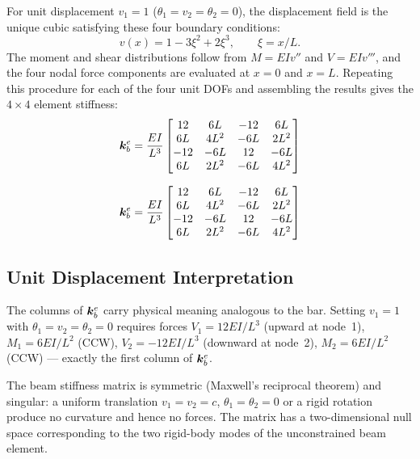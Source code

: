 For unit displacement $v_1 = 1$ ($\theta_1 = v_2 = \theta_2 = 0$), the
displacement field is the unique cubic satisfying these four boundary
conditions:
\[
    v(x) = 1 - 3\xi^2 + 2\xi^3, \qquad \xi = x/L .
\]
The moment and shear distributions follow from $M = EI v''$ and
$V = EI v'''$, and the four nodal force components are evaluated at
$x=0$ and $x=L$. Repeating this procedure for each of the four unit
DOFs and assembling the results gives the $4\times4$ element stiffness:
\begin{equation}
    \bm{k}^e_b = \frac{EI}{L^3}
    \begin{bmatrix}
        12  &  6L  & -12  &  6L \\
        6L  & 4L^2 & -6L  & 2L^2 \\
       -12  & -6L  &  12  & -6L \\
        6L  & 2L^2 & -6L  & 4L^2
    \end{bmatrix}
    \label{eq:beam_stiffness}
\end{equation}

\begin{importantbox}
\begin{equation*}
    \bm{k}^e_b = \frac{EI}{L^3}
    \begin{bmatrix}
        12  &  6L  & -12  &  6L \\
        6L  & 4L^2 & -6L  & 2L^2 \\
       -12  & -6L  &  12  & -6L \\
        6L  & 2L^2 & -6L  & 4L^2
    \end{bmatrix}
\end{equation*}
\end{importantbox}

\subsection{Unit Displacement Interpretation}

The columns of $\bm{k}^e_b$ carry physical meaning analogous to the bar.
Setting $v_1 = 1$ with $\theta_1 = v_2 = \theta_2 = 0$ requires forces
$V_1 = 12EI/L^3$ (upward at node~1), $M_1 = 6EI/L^2$ (CCW),
$V_2 = -12EI/L^3$ (downward at node~2), $M_2 = 6EI/L^2$ (CCW) —
exactly the first column of $\bm{k}^e_b$.

\begin{remark}
The beam stiffness matrix is symmetric (Maxwell's reciprocal theorem) and
singular: a uniform translation $v_1 = v_2 = c$, $\theta_1 = \theta_2 = 0$
or a rigid rotation produce no curvature and hence no forces. The matrix
has a two-dimensional null space corresponding to the two rigid-body modes
of the unconstrained beam element.
\end{remark}

